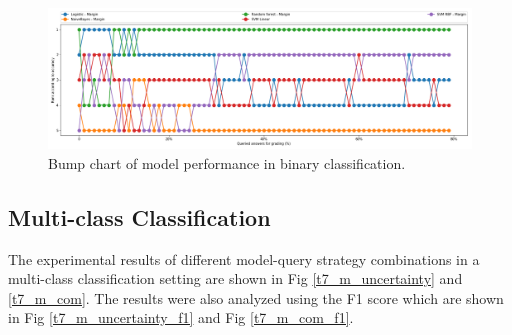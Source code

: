 \begin{figure}[!htb]
	\centering
	\includegraphics[scale=0.3]{images/binary/task7_rank}
	\caption{Bump chart of model performance in binary classification.}
	\label{t7_b_bump}
\end{figure}



%	



\clearpage
\subsection{Multi-class Classification}

The experimental results of different model-query strategy combinations in a multi-class classification setting are shown in Fig \ref{t7_m_uncertainty} and \ref{t7_m_com}. The results were also analyzed using the F1 score which are shown in Fig \ref{t7_m_uncertainty_f1} and Fig \ref{t7_m_com_f1}.

